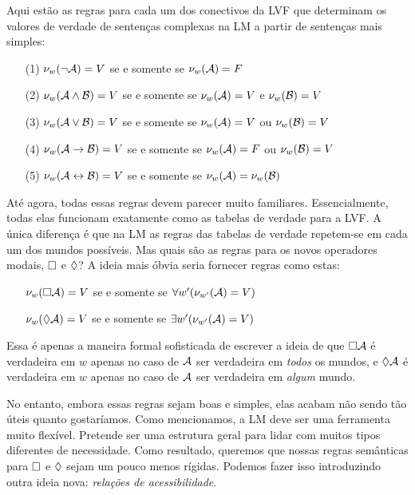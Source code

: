 Aqui estão as regras para cada um dos conectivos da LVF que determinam os valores de verdade de sentenças complexas na LM a partir de sentenças mais simples:

\begin{itemize}
	\item[(1)]$\nu_w(\neg\mathcal{A})=V$ se e somente se $\nu_w(\mathcal{A})=F$
	\item[(2)]$\nu_w(\mathcal{A}\wedge\mathcal{B})=V$ se e somente se $\nu_w(\mathcal{A})=V$ e $\nu_w(\mathcal{B})=V$
	\item[(3)]$\nu_w(\mathcal{A}\vee\mathcal{B})=V$ se e somente se $\nu_w(\mathcal{A})=V$ ou $\nu_w(\mathcal{B})=V$
	\item[(4)]$\nu_w(\mathcal{A}\rightarrow\mathcal{B})=V$ se e somente se $\nu_w(\mathcal{A})=F$ ou $\nu_w(\mathcal{B})=V$
	\item[(5)]$\nu_w(\mathcal{A}\leftrightarrow\mathcal{B})=V$ se e somente se $\nu_w(\mathcal{A})=\nu_w(\mathcal{B})$  
\end{itemize}
 

Até agora, todas essas regras devem parecer muito familiares. Essencialmente, todas elas funcionam exatamente como as tabelas de verdade para a LVF. A única diferença é que na LM as regras das tabelas de verdade repetem-se em cada um dos mundos possíveis.
Mas quais são as regras para os novos operadores modais, $\Box$ e $\Diamond$? A ideia mais óbvia seria fornecer regras como estas:

\begin{itemize}
	\item[]$\nu_w(\Box \mathcal{A})=V$ se e somente se $\forall w' (\nu_{w'}(\mathcal{A})=V)$
	\item[]$\nu_w(\Diamond \mathcal{A})=V $ se e somente se $\exists w' (\nu_{w'}(\mathcal{A})=V)$
\end{itemize}
Essa é apenas a maneira formal sofisticada de escrever a ideia de que $\Box\mathcal{A}$ é verdadeira em $w$ apenas no caso de $\mathcal{A}$ ser verdadeira em \emph{todos} os mundos, e $\Diamond\mathcal{A}$ é verdadeira em $w$ apenas no caso de $\mathcal{A}$ ser verdadeira em \emph{algum} mundo.

No entanto, embora essas regras sejam boas e simples, elas acabam não sendo tão úteis quanto gostaríamos. Como mencionamos, a LM deve ser uma ferramenta muito flexível. Pretende ser uma estrutura geral para lidar com muitos tipos diferentes de necessidade. Como resultado, queremos que nossas regras semânticas para  $\Box$ e $\Diamond$ sejam um pouco menos rígidas. Podemos fazer isso introduzindo outra ideia nova: \emph{ relações de acessibilidade}.

